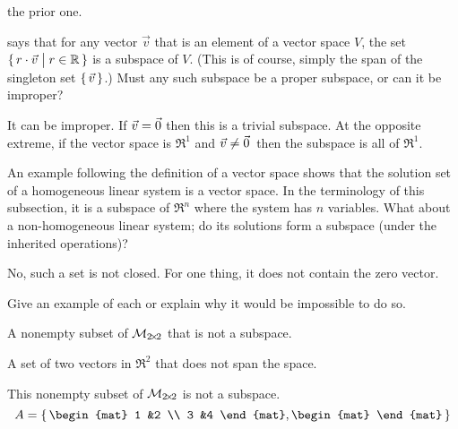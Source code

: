 \begin{exercises}
\begin{answer}
\begin{exparts}
          the prior one.
      \end{exparts}  
    \end{answer}
  \item 
     says that for any vector $\vec{v}$ 
    that is an element of 
    a vector space $V$, the set $\mbox{$\{\,r\cdot\vec{v}\bigm| r\in\mathbb{R}\,\}$}$
    is a subspace of $V$.
    (This is of course, simply the span 
    of the singleton set $\mbox{$\{\,\vec{v}\,\}$}$.)
    Must any such subspace be a proper subspace, or can it be improper?
    \begin{answer}
      It can be improper.
      If \( \vec{v}=\vec{0} \) then this is a trivial subspace.
      At the opposite extreme,
      if the vector space is \( \Re^1 \) and \( \vec{v}\neq\vec{0}\, \)
      then the subspace is all of $\Re^1$.  
    \end{answer}
  \item 
    An example following the definition of a vector space shows that the
    solution set of a homogeneous linear system is a vector space.
    In the terminology of this subsection, it is a subspace of $\Re^n$ where
    the system has $n$ variables.
    What about a non-homogeneous linear system; do its solutions form a 
    subspace (under the inherited operations)?
    \begin{answer}
      No, such a set is not closed.
      For one thing, it does not contain the zero vector.  
    \end{answer}
  \item \cite{Cleary} 
   Give an example of each or explain why it would be impossible 
   to do so.
   \begin{exparts}
     \item A nonempty subset of $\mathcal{M}_{2 \! \times \! 2}$ that is
       not a subspace.
     \item A set of two vectors in $\Re^2$ that does not span the space.
   \end{exparts}
   \begin{answer}
     \begin{exparts}
       \item This nonempty subset of $\mathcal{M}_{2 \! \times \! 2}$ is not a subspace.
         \begin{equation*}
           A=\set{
             \begin{mat}
               1 &2 \\
               3 &4
             \end{mat},
             \begin{mat}

\end{mat}}
\end{equation*}
\end{exparts}
\end{answer}
\end{exercises}
